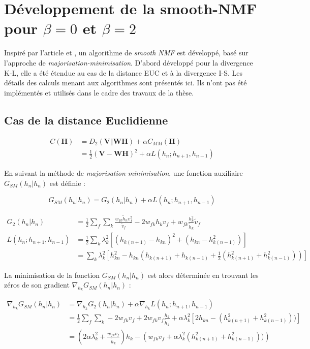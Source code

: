 \chapter{Développement de la smooth-NMF pour $\beta = 0$ et $\beta = 2$}\label{annex:smoothNMF}

Inspiré par l'article \cite{essid2013smooth} et \cite{fevotte_algorithms_2011}, un algorithme de \textit{smooth NMF} est développé, basé sur l'approche de \textit{majorisation-minimisation}. D'abord développé pour la divergence K-L, elle a été étendue au cas de la distance EUC et à la divergence I-S. Les détails des calculs menant aux algorithmes sont présentés ici. Ils n'ont pas été implémentés et utilisés dans le cadre des travaux de la thèse.

\section{Cas de la distance Euclidienne}
\begin{align}
C(\mathbf{H}) &= D_2(\mathbf{V} \Vert \mathbf{WH}) + \alpha C_{MM}(\mathbf{H})\\
 &= \frac{1}{2}(\mathbf{V}-\mathbf{WH})^2+\alpha L(h_n; h_{n+1}, h_{n-1}) 
\end{align}

En suivant la méthode de \textit{majorisation-minimisation}, une fonction auxiliaire $G_{SM}(h_n\vert h_n)$ est définie : 

\begin{equation}
G_{SM}(h_n\vert h_n) = G_{2}(h_n\vert h_n)+\alpha L(h_n; h_{n+1}, h_{n-1})
\end{equation}

\begin{align}
G_{2}(h_n\vert h_n) &= \frac{1}{2}\sum_{f} \sum_{k} \frac{w_{fk}\tilde{h}_n v_f^2}{\tilde{v}_f}-2w_{fk} h_k v_f+w_{fk}\frac{h_k^2}{\tilde{h}_k} \tilde{v}_f\\
L(h_n; h_{n+1}, h_{n-1}) &= \frac{1}{2}\sum_{k}\lambda_k^2 \left[ (h_{k(n+1)}-h_{kn})^2+(h_{kn}-h_{k(n-1)}^2) \right]\\
 &= \sum_k \lambda_k^2 \left[ h_{kn}^2- h_{kn}(h_{k(n+1)}+h_{k(n-1)}+\frac{1}{2} (h_{k(n+1)}^2+h_{k(n-1)}^2)) \right]
\end{align}

La minimisation de la fonction $G_{SM}(h_n\vert h_n)$ est alors déterminée en trouvant les zéros de son gradient $\nabla_{h_k} G_{SM}(h_n\vert h_n)$ :

\begin{align}
\nabla_{h_k} G_{SM}(h_n\vert h_n) &= \nabla_{h_k} G_{2}(h_n\vert h_n) + \alpha \nabla_{h_k} L(h_n; h_{n+1}, h_{n-1})\\
 &= \frac{1}{2}\sum_{f} \sum_{k} -2 w_{fk} v_f + 2 w_{fk} v_f \frac{h_k}{\tilde{h}_k} + \alpha \lambda_k^2 \left[ 2 h_{kn} - (h_{k(n+1)}^2+h_{k(n-1)}^2)) \right]\\
 &= \left( 2\alpha \lambda_k^2 + \frac{w_{fk} v_f} {\tilde{h}_k}\right)h_k - \left(w_{fk} v_f + \alpha   \lambda_k^2 (h_{k(n+1)}^2+h_{k(n-1)}^2))\right) \label{eq:smooth_2}
\end{align}

